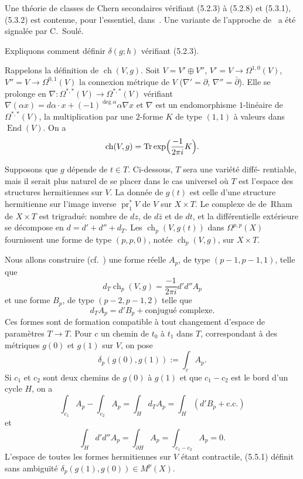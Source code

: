 \documentclass[12pt,a4paper]{article}
\theoremstyle{plain}
\theoremstyle{definition}
\DeclareMathOperator{\Tr}{Tr}
\DeclareMathOperator{\ch}{ch}
\DeclareMathOperator{\End}{End}
\DeclareMathOperator{\pr}{pr}
\begin{document}
Une th\'eorie de classes de Chern secondaires v\'erifiant (5.2.3) \`a (5.2.8) et
(5.3.1), (5.3.2) est contenue, pour l'essentiel, dans~\cite{4}. Une variante de l'approche
de~\cite{4} a \'et\'e signal\'ee par C.~Soul\'e.

Expliquons comment d\'efinir $\delta(g; h)$ v\'erifiant (5.2.3).

Rappelons la d\'efinition de $\ch(V, g)$. Soit $V = V' \oplus V''$, $V' = V \to \Omega^{1,0}(V)$,
$V'' = V \to \Omega^{0,1}(V)$ la connexion m\'etrique de $V$ ($\nabla' = \partial$, $\nabla'' = \bar\partial$). Elle se prolonge
en $\nabla: \Omega^{*,*}(V) \to \Omega^{*,*}(V)$ v\'erifiant $\nabla(\alpha x) = d\alpha \cdot x + (-1)^{\deg \alpha} \alpha \nabla x$ et $\nabla$
est un endomorphisme $1$-lin\'eaire de $\Omega^{*,*}(V)$, la multiplication par une $2$-forme
$K$ de type $(1,1)$ \`a valeurs dans $\End(V)$. On a
\[
\ch(V, g) = \Tr \exp\Bigl(\frac{-1}{2\pi i} K\Bigr) .
\]

Supposons que $g$ d\'epende de $t \in T$. Ci-dessous, $T$ sera une vari\'et\'e diff\'e-
rentiable, mais il serait plus naturel de se placer dans le cas universel o\`u
$T$ est l'espace des structures hermitiennes sur $V$. La donn\'ee de $g(t)$ est
celle d'une structure hermitienne sur l'image inverse $\pr_1^* V$ de $V$ sur $X \times T$.
Le complexe de de~Rham de $X \times T$ est trigradu\'e: nombre de $dz$, de $d\bar{z}$ et
de $dt$, et la diff\'erentielle ext\'erieure se d\'ecompose en $d = d' + d'' + d_T$.
Les $\ch_p(V, g(t))$ dans $\Omega^{p,p}(X)$ fournissent une forme de type $(p,p,0)$, not\'ee
$\ch_p(V, g)$, sur $X \times T$.

Nous allons construire (cf.~\cite{4}) une forme r\'eelle $A_p$, de type $(p-1, p-1,
1)$, telle que
\[
d_T \ch_p(V, g) = \frac{-1}{2\pi i} d'd'' A_p
\]
et une forme $B_p$, de type $(p-2, p-1, 2)$ telle que
\[
d_T A_p = d' B_p + \text{conjugu\'e complexe} .
\]
Ces formes sont de formation compatible \`a tout changement d'espace de param\`etres
$T \to T$. Pour $c$ un chemin de $t_0$ \`a $t_1$ dans $T$, correspondant \`a des m\'etriques
$g(0)$ et $g(1)$ sur $V$, on pose
\begin{equation}\label{eq:5.5.1}
\delta_p(g(0), g(1)) := \int_c A_p .
\end{equation}
Si $c_1$ et $c_2$ sont deux chemins de $g(0)$ \`a $g(1)$ et que $c_1 - c_2$ est le bord d'un cycle $H$, on a
\[
\int_{c_1} A_p - \int_{c_2} A_p = \int_H d_T A_p = \int_H (d' B_p + \text{c.c.})
\]
et
\[
\int_H d'd'' A_p = \int_{\partial H} A_p = \int_{c_1 - c_2} A_p = 0 .
\]
L'espace de toutes les formes hermitiennes sur $V$ \'etant contractile, (5.5.1)
d\'efinit sans ambigu\"it\'e $\delta_p(g(1), g(0)) \in M^p(X)$.
\end{document}
